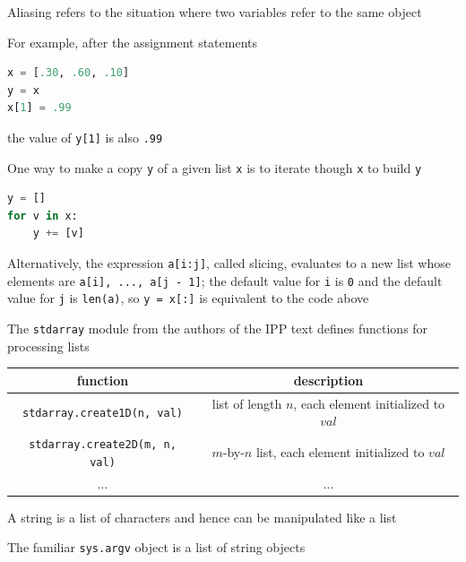 \documentclass[8pt,a4paper,compress]{beamer}
\begin{document}
\begin{frame}[fragile]
\pause

Aliasing refers to the situation where two variables refer to the same object

\pause\bigskip

For example, after the assignment statements

\smallskip

\begin{lstlisting}[language=Python,style=focusin]
x = [.30, .60, .10]
y = x
x[1] = .99
\end{lstlisting}

\smallskip

the value of \lstinline{y[1]} is also \lstinline{.99}

\pause\bigskip

One way to make a copy \lstinline{y} of a given list \lstinline{x} is to iterate though \lstinline{x} to build \lstinline{y}

\smallskip

\begin{lstlisting}[language=Python,style=focusin]
y = []
for v in x:
    y += [v]
\end{lstlisting}

\pause\bigskip

Alternatively, the expression \lstinline{a[i:j]}, called slicing,  evaluates to a new list whose elements are \lstinline{a[i], ..., a[j - 1]}; the default value for \lstinline{i} is \lstinline{0} and the default value for \lstinline{j} is \lstinline{len(a)}, so \lstinline{y = x[:]} is equivalent to the code above

\pause\bigskip

The \lstinline{stdarray} module from the authors of the IPP text defines functions for processing lists

\begin{center}
\begin{tabular}{cc}
function & description \\ \hline
\lstinline$stdarray.create1D(n, val)$ & list of length $n$, each element initialized to $val$ \\
\lstinline$stdarray.create2D(m, n, val)$ & $m$-by-$n$ list, each element initialized to $val$ \\
$\dots$ & $\dots$
\end{tabular} 
\end{center}

\pause

A string is a list of characters and hence can be manipulated like a list

\pause\bigskip

The familiar \lstinline{sys.argv} object is a list of string objects
\end{frame}
\end{document}
